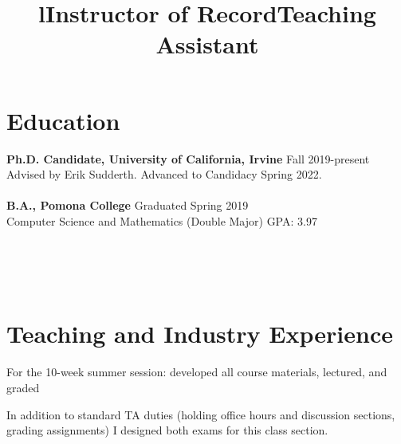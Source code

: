 \documentclass[margin]{res}
\begin{document}
\begin{resume}

\section{Education}
\textbf{Ph.D. Candidate, University of California, Irvine} \hfill Fall 2019-present\\
Advised by Erik Sudderth. Advanced to Candidacy Spring 2022.\\ \\
\textbf{B.A., Pomona College} \hfill Graduated Spring 2019\\
Computer Science and Mathematics (Double Major) \hfill 
GPA: 3.97



\begin{format}
\title{l}\\
\\
\body\\
\end{format}
\section{Teaching and Industry Experience}
\title{\textbf{Instructor of Record}}
\begin{position}
	For the 10-week summer session: developed all course materials, lectured, and graded
\end{position}
\title{\textbf{Teaching Assistant}}
\begin{position}
	In addition to standard TA duties (holding office hours and discussion sections, grading assignments) I designed both exams for this class section. 
\end{position}


\end{resume}
\end{document}
